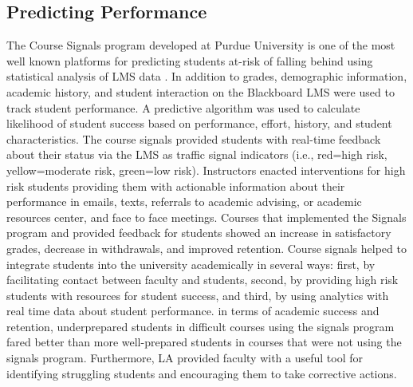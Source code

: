 \documentclass[sigconf]{acmart}
\begin{document}

\subsection{Predicting Performance} 

The Course Signals program developed at Purdue University 
is one of the most well known platforms for predicting students at-risk of 
falling behind using statistical analysis of LMS data \cite{arnoldPistilli12}. 
In addition to grades, demographic information, academic history, and student 
interaction on the Blackboard LMS were used to track student performance. A 
predictive algorithm was used to calculate likelihood of student success based 
on performance, effort, history, and student characteristics. The course signals 
provided students with real-time feedback about their status via the LMS as 
traffic signal indicators (i.e., red=high risk, yellow=moderate risk, green=low 
risk). Instructors enacted interventions for high risk students providing them 
with actionable information about their performance in emails, texts, referrals
to academic advising, or academic resources center, and face to face meetings.
Courses that implemented the Signals program and provided feedback for students
showed an increase in satisfactory grades, decrease in withdrawals, and 
improved retention. Course signals helped to integrate students into the 
university academically in several ways: first, by facilitating contact 
between faculty and students, second, by providing high risk students with 
resources for student success, and third, by using analytics with real time 
data about student performance. in terms of academic success and retention, 
underprepared students in difficult courses using the signals program fared 
better than more well-prepared students in courses that were not using the 
signals program. Furthermore, LA provided faculty with a useful tool for 
identifying struggling students and encouraging them to take corrective actions.  

\end{document}
